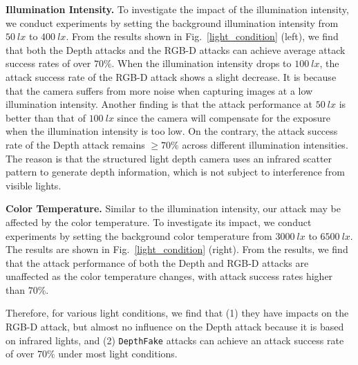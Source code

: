 \textbf{Illumination Intensity.} To investigate the impact of the illumination intensity, we conduct  experiments by setting the background illumination intensity from $50~lx$ to $400~lx$.
From the results shown in Fig.~\ref{light_condition} (left), we find that both the Depth attacks and the RGB-D attacks can achieve average attack success rates of over $70\%$.
When the illumination intensity drops to $100~lx$, the attack success rate of the RGB-D attack shows a slight decrease. 
It is because  that the camera suffers from more noise when capturing images at a low illumination intensity. Another finding is that the attack performance at $50~lx$ is better than that of $100~lx$ since the camera will compensate for the exposure when the illumination intensity is too low.
On the contrary, the attack success rate of the Depth attack remains $\geq$$70\%$ across different illumination intensities. The reason is that the structured light depth camera uses an infrared scatter pattern to generate depth information, which is not subject to interference from visible lights.


\textbf{Color Temperature.} Similar to the illumination intensity, our attack may be affected by the color temperature. To investigate its impact, we conduct experiments by setting the background color temperature from $3000~lx$ to $6500~lx$.
The results are shown in Fig.~\ref{light_condition} (right). From the results, we find that the attack performance of both the Depth and RGB-D  attacks are unaffected as the color temperature changes, with attack success rates higher than $70\%$.

Therefore, for various light conditions, we find that (1) they have impacts on the RGB-D attack, but almost no influence on the Depth attack because it is based on infrared lights, and (2) \texttt{DepthFake} attacks can achieve an attack success rate of over $70\%$ under most light conditions.



